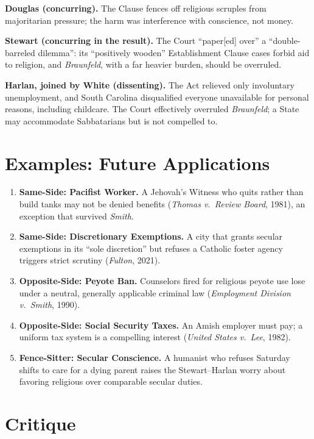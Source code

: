 \documentclass[12pt]{article}
\begin{document}
\textbf{Douglas (concurring).} The Clause fences off religious scruples from majoritarian pressure; the harm was interference with conscience, not money.

\textbf{Stewart (concurring in the result).} The Court ``paper[ed] over'' a ``double-barreled dilemma'': its ``positively wooden'' Establishment Clause cases forbid aid to religion, and \textit{Braunfeld}, with a far heavier burden, should be overruled.

\textbf{Harlan, joined by White (dissenting).} The Act relieved only involuntary unemployment, and South Carolina disqualified everyone unavailable for personal reasons, including childcare. The Court effectively overruled \textit{Braunfeld}; a State may accommodate Sabbatarians but is not compelled to.

\section{Examples: Future Applications}

\begin{enumerate}
\item \textbf{Same-Side: Pacifist Worker.} A Jehovah's Witness who quits rather than build tanks may not be denied benefits (\textit{Thomas v.\ Review Board}, 1981), an exception that survived \textit{Smith}.
\item \textbf{Same-Side: Discretionary Exemptions.} A city that grants secular exemptions in its ``sole discretion'' but refuses a Catholic foster agency triggers strict scrutiny (\textit{Fulton}, 2021).
\item \textbf{Opposite-Side: Peyote Ban.} Counselors fired for religious peyote use lose under a neutral, generally applicable criminal law (\textit{Employment Division v.\ Smith}, 1990).
\item \textbf{Opposite-Side: Social Security Taxes.} An Amish employer must pay; a uniform tax system is a compelling interest (\textit{United States v.\ Lee}, 1982).
\item \textbf{Fence-Sitter: Secular Conscience.} A humanist who refuses Saturday shifts to care for a dying parent raises the Stewart--Harlan worry about favoring religious over comparable secular duties.
\end{enumerate}

\section{Critique}
\end{document}
